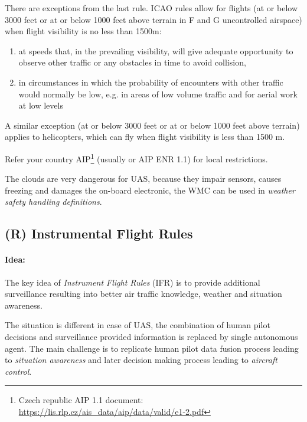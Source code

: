 \noindent There are exceptions from the last rule. ICAO rules allow for flights (at or below 3000 feet or at or below 1000 feet above terrain in F and G uncontrolled airspace) when flight visibility is no less than 1500m:
\begin{enumerate}
    \item at speeds that, in the prevailing visibility, will give adequate opportunity to observe other traffic or any obstacles in time to avoid collision,
    
    \item in circumstances in which the probability of encounters with other traffic would normally be low, e.g. in areas of low volume traffic and for aerial work at low levels
\end{enumerate}

\noindent A similar exception (at or below 3000 feet or at or below 1000 feet above terrain) applies to helicopters, which can fly when flight visibility is less than 1500 m.

Refer your country AIP\footnote{Czech republic AIP 1.1 document: \url{https://lis.rlp.cz/ais_data/aip/data/valid/e1-2.pdf}} (usually  or AIP ENR 1.1) for local restrictions.

\begin{note}
    The clouds are very dangerous for UAS, because they impair sensors, causes freezing and damages the on-board electronic, the WMC can be used in \emph{weather safety handling definitions}.
\end{note}

\subsection{(R) Instrumental Flight Rules}\label{sec:InstrumentalFlightRules}
\paragraph{Idea:} The key idea of \emph{Instrument Flight Rules} (IFR) is to provide additional surveillance resulting into better air traffic knowledge, weather and situation awareness. 

The situation is different in case of UAS, the combination of human pilot decisions and surveillance provided information is replaced by single autonomous agent. The main challenge is to replicate human pilot data fusion process leading to \emph{situation awareness} and later decision making process leading to \emph{aircraft control}.

